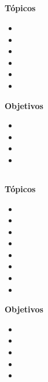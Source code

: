 \subsection{\NCSEISDef }\label{sec:BOK-NC6}

\textbf{Tópicos}
\begin{itemize}
	\item \NCSEISTopicVista
	\item \NCSEISTopicUso
	\item \NCSEISTopicNombres
	\item \NCSEISTopicProveedores
	\item \NCSEISTopicAsuntos
	\item \NCSEISTopicAsuntosde
\end{itemize}

\textbf{Objetivos}
\begin{itemize}
	\item \NCSEISObjUNO
	\item \NCSEISObjDOS
	\item \NCSEISObjTRES
	\item \NCSEISObjCUATRO
\end{itemize}

\subsection{\NCSIETEDef }\label{sec:BOK-NC7}

\textbf{Tópicos}
\begin{itemize}
	\item \NCSIETETopicRepresentaciones
	\item \NCSIETETopicAlgoritmos
	\item \NCSIETETopicCompresion
	\item \NCSIETETopicCompresionde
	\item \NCSIETETopicAudio
	\item \NCSIETETopicImagenes
	\item \NCSIETETopicVideo
	\item \NCSIETETopicMedidas
\end{itemize}

\textbf{Objetivos}
\begin{itemize}
	\item \NCSIETEObjUNO
	\item \NCSIETEObjDOS
	\item \NCSIETEObjTRES
	\item \NCSIETEObjCUATRO
	\item \NCSIETEObjCINCO
\end{itemize}

